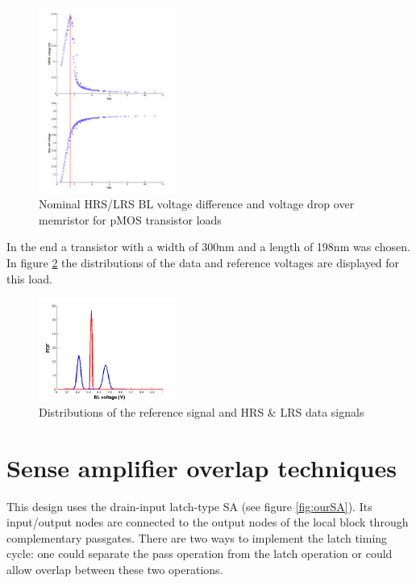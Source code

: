 \documentclass[journal]{IEEEtran}
\begin{document}
\begin{figure}[ht!]
  \centering
  \includegraphics[width=0.4\textwidth]{../fig/hfdst-last-length.png}
  \caption{Nominal HRS/LRS BL voltage difference and voltage drop over memristor for pMOS transistor loads}
  \label{fig:switchloadresults}
\end{figure}

In the end a transistor with a width of 300nm and a length of 198nm was chosen. In figure \ref{fig:distributions} the distributions of the data and reference voltages are displayed for this load.

\begin{figure}[ht!]
  \centering
  \includegraphics[width=0.4\textwidth]{../fig/hfdst-last-var2.png}
  \caption{Distributions of the reference signal and HRS \& LRS data signals }
  \label{fig:distributions}
\end{figure}

\section{Sense amplifier overlap techniques}\label{sens}
This design uses the drain-input latch-type SA (see figure \ref{fig:ourSA}). Its input/output nodes are connected to the output nodes of the local block through complementary passgates. There are two ways to implement the latch timing cycle: one could separate the pass operation from the latch operation or could allow overlap between these two operations.
\end{document}

